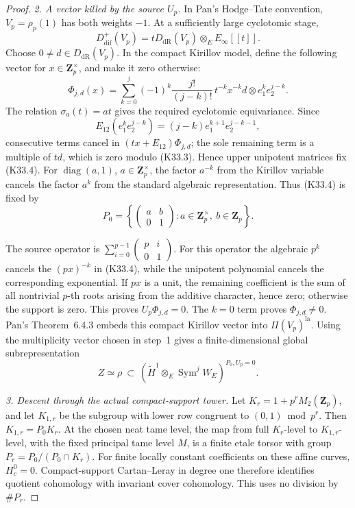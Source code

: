 \begin{proof}
\emph{2. A vector killed by the source \(U_p\).}
In Pan's Hodge--Tate convention, \(V_p=\rho_p(1)\) has both
weights \(-1\).  At a sufficiently large cyclotomic stage,
\[
 D_{\mathrm{dif}}^+(V_p)
   =tD_{\mathrm{dR}}(V_p)\otimes_E E_\infty[[t]].
 \tag{K33.3}
\]
Choose \(0\ne d\in D_{\mathrm{dR}}(V_p)\).  In the compact
Kirillov model, define the following vector for
\(x\in\mathbf Z_p^\times\), and make it zero otherwise:
\[
 \Phi_{j,d}(x)=
 \sum_{k=0}^j(-1)^k\frac{j!}{(j-k)!}\,
 t^{-k}x^{-k}d\otimes e_1^k e_2^{j-k}.
 \tag{K33.4}
\]
The relation \(\sigma_a(t)=at\) gives the required cyclotomic
equivariance.  Since
\[
 E_{12}(e_1^k e_2^{j-k})
    =(j-k)e_1^{k+1}e_2^{j-k-1},
\]
consecutive terms cancel in
\((tx+E_{12})\Phi_{j,d}\); the sole remaining term is a
multiple of \(td\), which is zero modulo (K33.3).
Hence upper unipotent matrices fix (K33.4).  For
\(\operatorname{diag}(a,1)\), \(a\in\mathbf Z_p^\times\),
the factor \(a^{-k}\) from the Kirillov variable cancels
the factor \(a^k\) from the standard algebraic representation.
Thus (K33.4) is fixed by
\[
 P_0=\left\{
 \begin{pmatrix}a&b\\0&1\end{pmatrix}:
 a\in\mathbf Z_p^\times,\ b\in\mathbf Z_p\right\}.
\]

The source operator is
\(\sum_{i=0}^{p-1}\left(\begin{smallmatrix}p&i\\0&1\end{smallmatrix}\right)\).
For this operator the algebraic \(p^k\) cancels the
\((px)^{-k}\) in (K33.4), while the unipotent polynomial
cancels the corresponding exponential.  If \(px\) is a unit,
the remaining coefficient is the sum of all nontrivial
\(p\)-th roots arising from the additive character, hence zero;
otherwise the support is zero.  This proves \(U_p\Phi_{j,d}=0\).
The \(k=0\) term proves \(\Phi_{j,d}\ne0\).
Pan's Theorem~6.4.3 embeds this compact Kirillov vector into
\(\Pi(V_p)^{\mathrm{la}}\).  Using the multiplicity vector
chosen in step~1 gives a finite-dimensional global subrepresentation
\[
 Z\simeq\rho\ \subset\
 \left(\widetilde H^1\otimes_E
       \operatorname{Sym}^j W_E\right)^{P_0,U_p=0}.
 \tag{K33.5}
\]

\emph{3. Descent through the actual compact-support tower.}
Let \(K_r=1+p^rM_2(\mathbf Z_p)\), and let \(K_{1,r}\) be
the subgroup with lower row congruent to \((0,1)\bmod p^r\).
Then \(K_{1,r}=P_0K_r\).  At the chosen neat tame level,
the map from full \(K_r\)-level to \(K_{1,r}\)-level,
with the fixed principal tame level \(M\), is
a finite etale torsor with group
\(P_r=P_0/(P_0\cap K_r)\).
For finite locally constant coefficients on these affine
curves, \(H_c^0=0\).  Compact-support Cartan--Leray in degree
one therefore identifies quotient cohomology with invariant
cover cohomology.  This uses no division by \(\#P_r\).


\end{proof}
